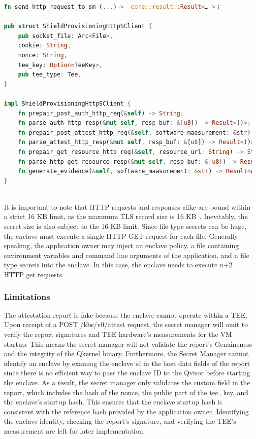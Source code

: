 \begin{lstlisting}[language=rust, caption= Functions for building the HTTP requests defined in the KBS attestation protocol, label={lst:http_connection}]
fn send_http_request_to_sm (...)->  core::result::Result<… >；

pub struct ShieldProvisioningHttpSClient {
    pub socket_file: Arc<File>,
    cookie: String,
    nonce: String,
    tee_key: Option<TeeKey>,
    pub tee_type: Tee,
}

impl ShieldProvisioningHttpSClient {
    fn prepair_post_auth_http_req(&self) -> String;
    fn parse_auth_http_resp(&mut self, resp_buf: &[u8]) -> Result<()>;
    fn prepair_post_attest_http_req(&self, software_maasurement: &str) -> Result<String>;
    fn parse_attest_http_resp(&mut self, resp_buf: &[u8]) -> Result<()>;
    fn prepair_get_resource_http_req(&self, resource_url: String) -> String;
    fn parse_http_get_resource_resp(&mut self, resp_buf: &[u8]) -> Result<Vec<u8>>;
    fn generate_evidence(&self, software_maasurement: &str) -> Result<Attestation>;
}
    
\end{lstlisting}

It is important to note that HTTP requests and responses alike are bound within a strict 16 KB limit, as the maximum TLS record size is 16 KB~\cite*{tls_record_size}. Inevitably, the secret size is also subject to the 16 KB limit. Since file type secrets can be huge, the 
enclave must execute a single HTTP GET request for each file. Generally speaking, the application owner may inject an enclave policy, a file containing environment variables and command line arguments of the application, and n file type secrets into the enclave. 
In this case, the enclave needs to execute n+2 HTTP get requests.

\subsubsection{Limitations}
\label{subsec:Limitations}

The attestation report is fake because the enclave cannot operate within a TEE. Upon receipt of a POST /kbs/v0/attest request, the secret manager will omit to verify the report signatures and TEE hardware's measurements for the VM startup. This means the secret manager will not validate the report's 
Genuineness and the integrity of the Qkernel binary. Furthermore, the Secret Manager cannot identify an enclave by examing the enclave id in the host data fields of the report since there is no efficient way to pass the enclave ID to the Qvisor before starting the enclave. As a result, the secret 
manager only validates the custom field in the report, which includes the hash of the nonce, the public part of the tee\_key, and the enclave's startup hash. This ensures that the enclave startup hash is consistent with the reference hash provided by the application owner. Identifying the enclave 
identity, checking the report's signature, and verifying the TEE's measurement are left for later implementation.


